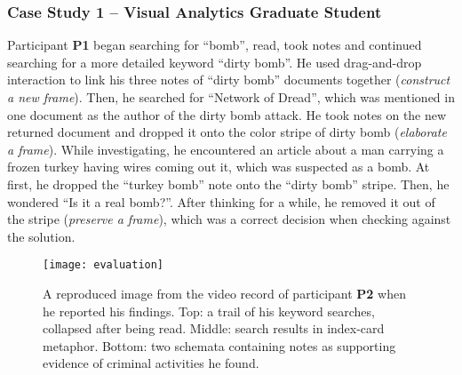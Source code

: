 \subsubsection{Case Study 1 -- Visual Analytics Graduate Student}
Participant \textbf{P1} began searching for ``bomb'', read, took notes and continued searching for a more detailed keyword ``dirty bomb''. He used drag-and-drop interaction to link his three notes of ``dirty bomb'' documents together (\textit{construct a new frame}). Then, he searched for ``Network of Dread'', which was mentioned in one document as the author of the dirty bomb attack. He took notes on the new returned document and dropped it onto the color stripe of dirty bomb (\textit{elaborate a frame}). While investigating, he encountered an article about a man carrying a frozen turkey having wires coming out it, which was suspected as a bomb. At first, he dropped the ``turkey bomb'' note onto the ``dirty bomb'' stripe. Then, he wondered ``Is it a real bomb?''. After thinking for a while, he removed it out of the stripe (\textit{preserve a frame}), which was a correct decision when checking against the solution.

\begin{figure*}[ht]
\centering
\texttt{[image: evaluation]}
\caption{A reproduced image from the video record of participant \textbf{P2} when he reported his findings. Top: a trail of his keyword searches, collapsed after being read. Middle: search results in index-card metaphor. Bottom: two schemata containing notes as supporting evidence of criminal activities he found.}
\label{fig:evaluation}
\end{figure*}

